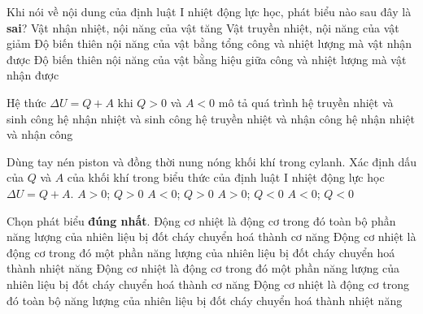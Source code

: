 	\begin{ex}
	Khi nói về nội dung của định luật I nhiệt động lực học, phát biểu nào sau đây là \textbf{sai}?
	\choice
	{Vật nhận nhiệt, nội năng của vật tăng}
	{Vật truyền nhiệt, nội năng của vật giảm}
	{Độ biến thiên nội năng của vật bằng tổng công và nhiệt lượng mà vật nhận được}
	{\True Độ biến thiên nội năng của vật bằng hiệu giữa công và nhiệt lượng mà vật nhận được}
	\loigiai{ }
\end{ex}
	\begin{ex}
			Hệ thức $\Delta U=Q+A$ khi $Q>0$ và $A<0$ mô tả quá trình
		\choice
		{hệ truyền nhiệt và sinh công}
		{\True hệ nhận nhiệt và sinh công}
		{hệ truyền nhiệt và nhận công}
		{hệ nhận nhiệt và nhận công}
		\loigiai{ }
	\end{ex}
		\begin{ex}
			Dùng tay nén piston và đồng thời nung nóng khối khí trong cylanh. Xác định dấu của $Q$ và $A$ của khối khí trong biểu thức của định luật I nhiệt động lực học $\Delta U=Q+A$.
		\choice
		{\True $A>0$; $Q>0$}
		{$A<0$; $Q>0$}
		{$A>0$; $Q<0$}
		{$A<0$; $Q<0$}
		\loigiai{ }
	\end{ex}
		\begin{ex}
		Chọn phát biểu \textbf{đúng nhất}.
	\choice
	{Động cơ nhiệt là động cơ trong đó toàn bộ phần năng lượng của nhiên liệu bị đốt cháy chuyển hoá thành cơ năng}
	{Động cơ nhiệt là động cơ trong đó một phần năng lượng của nhiên liệu bị đốt cháy chuyển hoá thành nhiệt năng}
	{\True Động cơ nhiệt là động cơ trong đó một phần năng lượng của nhiên liệu bị đốt cháy chuyển hoá thành cơ năng}
	{Động cơ nhiệt là động cơ trong đó toàn bộ năng lượng của nhiên liệu bị đốt cháy chuyển hoá thành nhiệt năng}
	\loigiai{ }
\end{ex}

